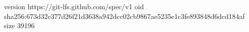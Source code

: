 version https://git-lfs.github.com/spec/v1
oid sha256:673d32c377d26f21d3638a942dcc02cb9867ae5235e1c3fe893848d6dcd184af
size 39196
